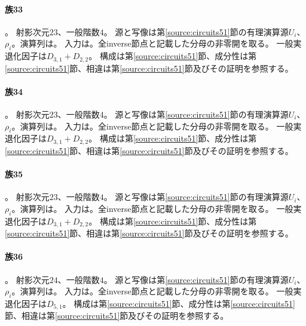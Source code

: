 \paragraph{族33}\label{catalogue:T33}
。
射影次元$23$、一般階数$4$。
源と写像は第\ref{source:circuits51}節の有理演算源$U_i$、$\rho_i$。演算列は。
入力は。全inverse節点と記載した分母の非零開を取る。
一般実退化因子は$D_{3,1}+D_{2,2}$。
構成は第\ref{source:circuits51}節、成分性は第\ref{source:circuits51}節、相違は第\ref{source:circuits51}節及びその証明を参照する。

\paragraph{族34}\label{catalogue:T34}
。
射影次元$23$、一般階数$4$。
源と写像は第\ref{source:circuits51}節の有理演算源$U_i$、$\rho_i$。演算列は。
入力は。全inverse節点と記載した分母の非零開を取る。
一般実退化因子は$D_{3,1}+D_{2,2}$。
構成は第\ref{source:circuits51}節、成分性は第\ref{source:circuits51}節、相違は第\ref{source:circuits51}節及びその証明を参照する。

\paragraph{族35}\label{catalogue:T35}
。
射影次元$23$、一般階数$4$。
源と写像は第\ref{source:circuits51}節の有理演算源$U_i$、$\rho_i$。演算列は。
入力は。全inverse節点と記載した分母の非零開を取る。
一般実退化因子は$D_{3,1}+D_{2,2}$。
構成は第\ref{source:circuits51}節、成分性は第\ref{source:circuits51}節、相違は第\ref{source:circuits51}節及びその証明を参照する。

\paragraph{族36}\label{catalogue:T36}
。
射影次元$24$、一般階数$4$。
源と写像は第\ref{source:circuits51}節の有理演算源$U_i$、$\rho_i$。演算列は。
入力は。全inverse節点と記載した分母の非零開を取る。
一般実退化因子は$D_{5,1}$。
構成は第\ref{source:circuits51}節、成分性は第\ref{source:circuits51}節、相違は第\ref{source:circuits51}節及びその証明を参照する。

